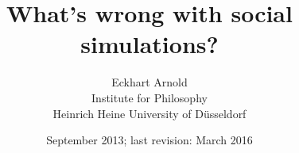 \documentclass[12pt, english, a4paper]{article}
\begin{document}
 

%

\title{What's wrong with social simulations?}


%
%
\author{Eckhart Arnold\\{\small Institute for Philosophy}\\{\small Heinrich Heine University of Düsseldorf}}
%
%
%
\date{September 2013; last revision: March 2016}
 
\maketitle
\end{document}
